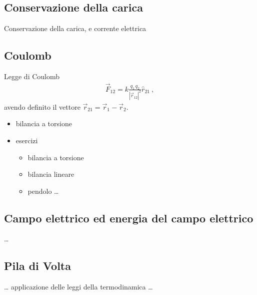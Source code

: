 \documentclass[letterpaper,10pt,italian]{jupyterBook}
\begin{document}
\subsection{Conservazione della carica}
\label{\detokenize{ch/electromagnetism/intro-experiments:conservazione-della-carica}}
\sphinxAtStartPar
Conservazione della carica, e corrente elettrica


\subsection{Coulomb}
\label{\detokenize{ch/electromagnetism/intro-experiments:coulomb}}
\sphinxAtStartPar
Legge di Coulomb
\begin{equation*}
\begin{split}\vec{F}_{12} = k \frac{q_1 \, q_2}{|\vec{r}_{12}|^2} \hat{r}_{21} \ ,\end{split}
\end{equation*}
\sphinxAtStartPar
avendo definito il vettore \(\vec{r}_{21} = \vec{r}_1 - \vec{r}_2\).
\begin{itemize}
\item {} 
\sphinxAtStartPar
bilancia a torsione

\item {} 
\sphinxAtStartPar
esercizi
\begin{itemize}
\item {} 
\sphinxAtStartPar
bilancia a torsione

\item {} 
\sphinxAtStartPar
bilancia lineare

\item {} 
\sphinxAtStartPar
pendolo
…

\end{itemize}

\end{itemize}


\subsection{Campo elettrico ed energia del campo elettrico}
\label{\detokenize{ch/electromagnetism/intro-experiments:campo-elettrico-ed-energia-del-campo-elettrico}}
\sphinxAtStartPar
…


\subsection{Pila di Volta}
\label{\detokenize{ch/electromagnetism/intro-experiments:pila-di-volta}}
\sphinxAtStartPar
… applicazione delle leggi della termodinamica …
\end{document}
